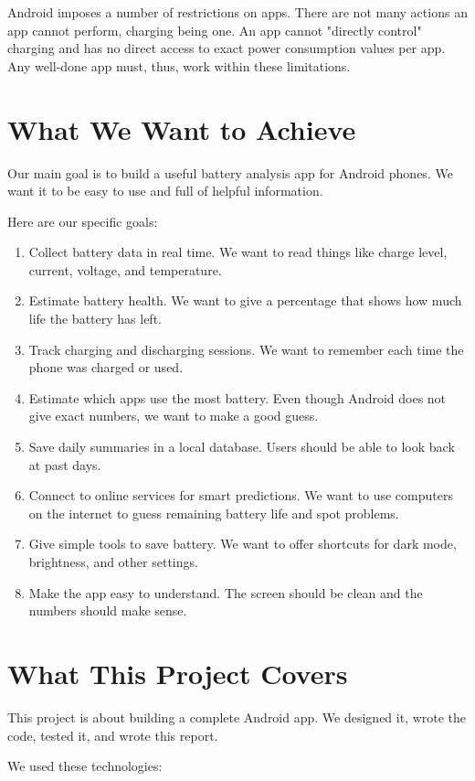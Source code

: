 \documentclass[12pt,a4paper]{report}
\begin{document}
Android imposes a number of restrictions on apps. There are not many actions an app cannot perform, charging being one. An app cannot "directly control" charging and has no direct access to exact power consumption values per app. Any well-done app must, thus, work within these limitations.

\section{What We Want to Achieve}
Our main goal is to build a useful battery analysis app for Android phones. We want it to be easy to use and full of helpful information.

Here are our specific goals:

\begin{enumerate}
    \item Collect battery data in real time. We want to read things like charge level, current, voltage, and temperature.
    \item Estimate battery health. We want to give a percentage that shows how much life the battery has left.
    \item Track charging and discharging sessions. We want to remember each time the phone was charged or used.
    \item Estimate which apps use the most battery. Even though Android does not give exact numbers, we want to make a good guess.
    \item Save daily summaries in a local database. Users should be able to look back at past days.
    \item Connect to online services for smart predictions. We want to use computers on the internet to guess remaining battery life and spot problems.
    \item Give simple tools to save battery. We want to offer shortcuts for dark mode, brightness, and other settings.
    \item Make the app easy to understand. The screen should be clean and the numbers should make sense.
\end{enumerate}

\section{What This Project Covers}
This project is about building a complete Android app. We designed it, wrote the code, tested it, and wrote this report.

We used these technologies:
\end{document}
